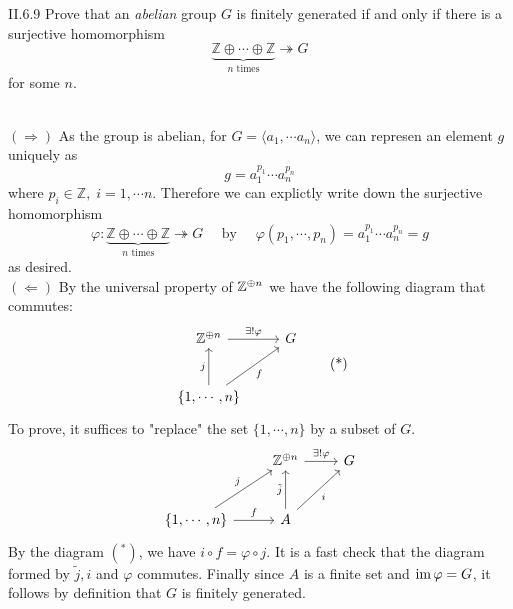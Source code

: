 \begin{problem}{II.6.9}
Prove that an \emph{abelian} group $G$ is finitely generated if and only if there is a surjective homomorphism
\[
    \underbrace{\mathbb{Z} \oplus \cdots \oplus \mathbb{Z}}_{n \text{ times}}\twoheadrightarrow G   
\]
for some $n$.
\end{problem}
\begin{pf} \\
$(\Rightarrow)$ As the group is abelian, for $G = \langle a_1, \cdots a_n \rangle$, we can represen an element $g$ uniquely as
\[
    g = a_1^{p_1} \cdots a_n^{p_n}    
\]
where $p_i\in \mathbb{Z}, \; i = 1, \cdots n$. Therefore we can explictly write down the surjective homomorphism
\[
\varphi : \underbrace{\mathbb{Z} \oplus \cdots \oplus \mathbb{Z}}_{n \text{ times}}\twoheadrightarrow G \quad \text{ by } \quad \varphi(p_1,\cdots ,p_n) = a_1^{p_1} \cdots a_n^{p_n} = g      
\]
as desired. \\
$(\Leftarrow)$ By the universal property of $\mathbb{Z}^{\oplus n}$ we have the following diagram that commutes:
\[
\begin{tikzcd}[row sep=large]
\Z^{\oplus n} \arrow[r, "\exists ! \varphi"] &G \\
\{1,\cdots,n\} \arrow[u, "j"] \arrow[ur, "f"']
\end{tikzcd}
\tag{*} 
\]
To prove, it suffices to "replace" the set $\{1,\cdots,n\}$ by a subset of $G$.
\[
\begin{tikzcd}[row sep=large]
& \Z^{\oplus n} \arrow[r, "\exists ! \varphi"] & G \\
{\{1,\cdots,n\}} \arrow[r, "f"] \arrow[ru, "j"] & A \arrow[u, "\tilde{j}"] \arrow[ru, "i"']    &  
\end{tikzcd}
\]
By the diagram $(^*)$, we have $i \circ f = \varphi \circ j$. It is a fast check that the diagram formed by $\tilde{j}, i$ and $\varphi$ commutes. Finally since $A$ is a finite set and $\operatorname{im} \varphi = G$, it follows by definition that $G$ is finitely generated.
\end{pf}

